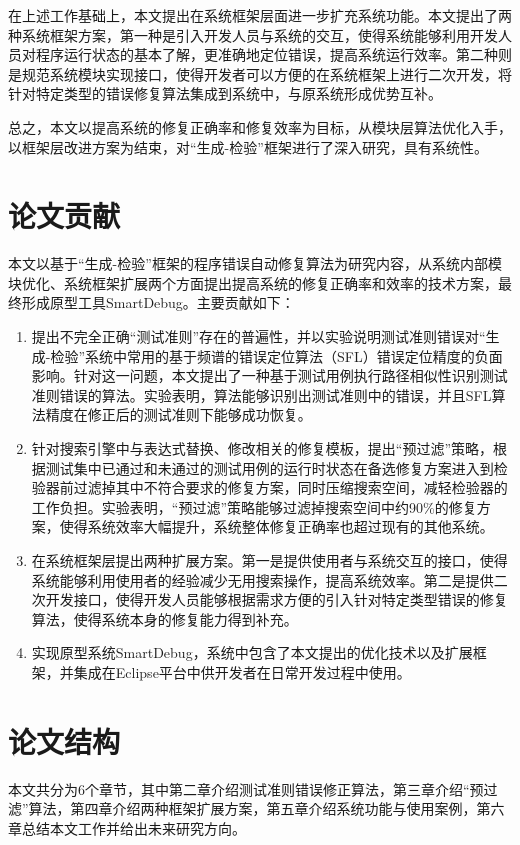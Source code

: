 在上述工作基础上，本文提出在系统框架层面进一步扩充系统功能。本文提出了两种系统框架方案，第一种是引入开发人员与系统的交互，使得系统能够利用开发人员对程序运行状态的基本了解，更准确地定位错误，提高系统运行效率。第二种则是规范系统模块实现接口，使得开发者可以方便的在系统框架上进行二次开发，将针对特定类型的错误修复算法集成到系统中，与原系统形成优势互补。

总之，本文以提高系统的修复正确率和修复效率为目标，从模块层算法优化入手，以框架层改进方案为结束，对“生成-检验”框架进行了深入研究，具有系统性。

\section{论文贡献}

本文以基于“生成-检验”框架的程序错误自动修复算法为研究内容，从系统内部模块优化、系统框架扩展两个方面提出提高系统的修复正确率和效率的技术方案，最终形成原型工具SmartDebug。主要贡献如下：
\begin{enumerate}[1.]
	\item 提出不完全正确“测试准则”存在的普遍性，并以实验说明测试准则错误对“生成-检验”系统中常用的基于频谱的错误定位算法（SFL）错误定位精度的负面影响。针对这一问题，本文提出了一种基于测试用例执行路径相似性识别测试准则错误的算法。实验表明，算法能够识别出测试准则中的错误，并且SFL算法精度在修正后的测试准则下能够成功恢复。
	\item 针对搜索引擎中与表达式替换、修改相关的修复模板，提出“预过滤”策略，根据测试集中已通过和未通过的测试用例的运行时状态在备选修复方案进入到检验器前过滤掉其中不符合要求的修复方案，同时压缩搜索空间，减轻检验器的工作负担。实验表明，“预过滤”策略能够过滤掉搜索空间中约90\%的修复方案，使得系统效率大幅提升，系统整体修复正确率也超过现有的其他系统。
	\item 在系统框架层提出两种扩展方案。第一是提供使用者与系统交互的接口，使得系统能够利用使用者的经验减少无用搜索操作，提高系统效率。第二是提供二次开发接口，使得开发人员能够根据需求方便的引入针对特定类型错误的修复算法，使得系统本身的修复能力得到补充。
	\item 实现原型系统SmartDebug，系统中包含了本文提出的优化技术以及扩展框架，并集成在Eclipse平台中供开发者在日常开发过程中使用。
\end{enumerate}



\section{论文结构}%

本文共分为6个章节，其中第二章介绍测试准则错误修正算法，第三章介绍“预过滤”算法，第四章介绍两种框架扩展方案，第五章介绍系统功能与使用案例，第六章总结本文工作并给出未来研究方向。
